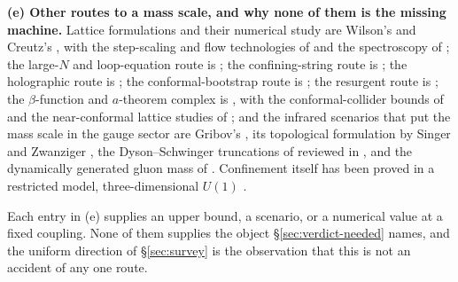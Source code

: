 \noindent\textbf{(e) Other routes to a mass scale, and why none of them is the missing machine.}
Lattice formulations and their numerical study are Wilson's \cite{wilson} and Creutz's \cite{creutz},
with the step-scaling and flow technologies of \cite{luscher-stepscaling,luscher-flow} and the
spectroscopy of \cite{morningstar}; the large-$N$ and loop-equation route is
\cite{thooft-planar,eguchi-kawai,makeenko-migdal}; the confining-string route is
\cite{polchinski-strominger,luscher-weisz}; the holographic route is
\cite{maldacena,gkp,witten,witten-thermal,polchinski-strassler,sakai-sugimoto}; the conformal-bootstrap
route is \cite{elshowk,prv}; the resurgent route is \cite{abs}; the $\beta$-function and
$a$-theorem complex is \cite{caswell,vrvl,banks-zaks,polchinski,komargodski-schwimmer,dksst,zamolodchikov,osborn},
with the conformal-collider bounds of \cite{hofman-maldacena,hofman-li} and the near-conformal lattice
studies of \cite{aoki}; and the infrared scenarios that put the mass scale in the gauge sector are
Gribov's \cite{gribov}, its topological formulation by Singer \cite{singer} and Zwanziger
\cite{zwanziger}, the Dyson--Schwinger truncations of \cite{vsmekal,fischer-alkofer} reviewed in
\cite{huber}, and the dynamically generated gluon mass of \cite{cornwall}. Confinement itself has
been proved in a restricted model, three-dimensional $U(1)$ \cite{gopfert}.

Each entry in (e) supplies an upper bound, a scenario, or a numerical value at a fixed coupling. None
of them supplies the object \S\ref{sec:verdict-needed} names, and the uniform direction of
\S\ref{sec:survey} is the observation that this is not an accident of any one route.

\label{part:reduction-end}
